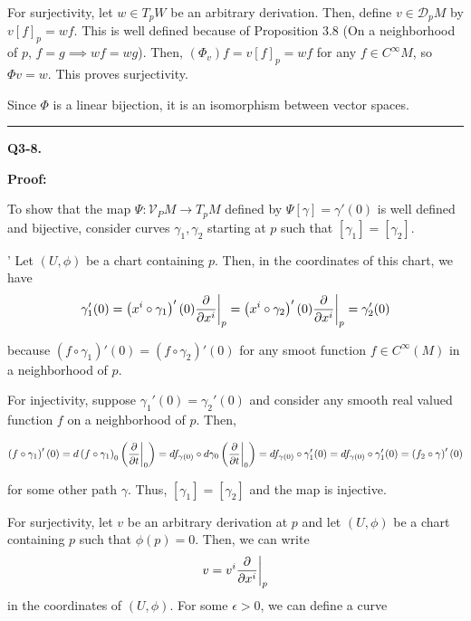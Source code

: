 \documentclass{article}
\newcommand{\restr}[2]{{%
  \left.\kern-\nulldelimiterspace %
  #1 %
  \vphantom{\big|} %
  \right|_{#2} %
  }}
\begin{document}
\vskip 0.25cm
For surjectivity, let $w \in T_p W$ be an arbitrary derivation. Then, define $v \in \mathcal{D}_p M$ by $v[f]_p = wf$. This is well defined because of Proposition 3.8 (On a neighborhood of $p$, $f = g \implies wf = wg$). Then, $\left( \Phi_v \right) f = v [f]_p = wf$ for any $f \in C^{\infty}M$, so $\Phi v = w$. This proves surjectivity.

\vskip 0.25cm
Since $\Phi$ is a linear bijection, it is an isomorphism between vector spaces. 

\vskip 0.5cm
\hrule 
\vskip 0.5cm



\textbf{Q3-8.} 

\vskip 0.5cm
\textbf{Proof:}

To show that the map $\Psi : \mathcal{V}_P M \rightarrow T_p M$ defined by $\Psi[\gamma] = \gamma'(0)$ is well defined and bijective, consider curves  $\gamma_1, \gamma_2$ starting at $p$ such that $[\gamma_1] = [\gamma_2]$.

\vskip 0.25cm'
Let $(U, \phi)$ be a chart containing $p$. Then, in the coordinates of this chart, we have 
\[ \gamma_1'(0) = \left( x^i \circ \gamma_1 \right)'(0) \restr{\frac{\partial }{\partial x^i}}{p} = \left(x^i \circ \gamma_2\right)'(0) \restr{\frac{\partial }{\partial x^i}}{p}  =\gamma_2'(0)\]

because $ \left( f \circ \gamma_1 \right)'(0) =  \left( f \circ \gamma_2 \right)'(0)$ for any smoot function $f \in C^{\infty}(M)$ in a neighborhood of $p$. 


\vskip 0.5cm
For injectivity, suppose $\gamma_1'(0) = \gamma_2'(0)$ and consider any smooth real valued function $f$ on a neighborhood of $p$. Then,

\[ \left(f \circ \gamma_1\right)'(0) = d\left(f \circ \gamma_1\right)_0 \left(\restr{\frac{\partial}{\partial t}}{0}\right) = df_{\gamma(0)} \circ d\gamma_0 \left(\restr{\frac{\partial}{\partial t}}{0} \right) = df_{\gamma(0)} \circ \gamma_1'(0) =  df_{\gamma(0)} \circ \gamma_1'(0)  = \left(f_2 \circ \gamma\right)'(0)\]

for some other path $\gamma$. Thus, $[\gamma_1] = [\gamma_2]$ and the map is injective.

\vskip 0.5cm
For surjectivity, let $v$ be an arbitrary derivation at $p$ and let $(U, \phi)$ be a chart containing $p$ such that $\phi(p) = 0$. Then, we can write 
\[ v = v^i \restr{\frac{\partial}{\partial x^i}}{p} \]
in the coordinates of $(U, \phi)$. For some $\epsilon > 0$, we can define a curve 
\end{document}
